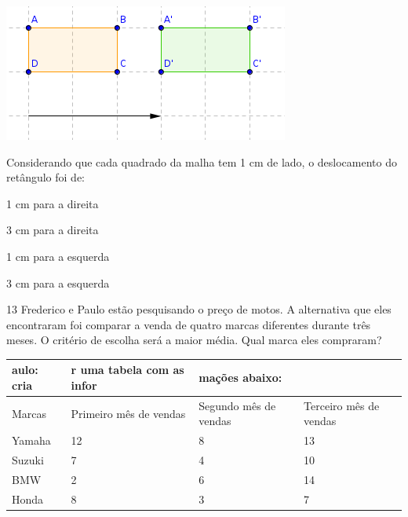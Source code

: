 \includegraphics{./imgSAEB_7_MAT/media/image98.png}

Considerando que cada quadrado da malha tem 1 cm de lado, o deslocamento
do retângulo foi de:

\begin{escolha}
\item
  1 cm para a direita
\item
  3 cm para a direita
\item
  1 cm para a esquerda
\item
  3 cm para a esquerda
\end{escolha}



\num{13} Frederico e Paulo estão pesquisando o preço de motos. A alternativa
que eles encontraram foi comparar a venda de quatro marcas diferentes
durante três meses. O critério de escolha será a maior média. Qual marca
eles compraram?

\begin{longtable}[]{@{}llll@{}}
\toprule
aulo: cria & r uma tabela com as infor & mações abaixo: &\tabularnewline
\midrule
\endhead
Marcas~ & Primeiro mês de vendas & Segundo mês de vendas & Terceiro mês
de vendas\tabularnewline
Yamaha & 12 & 8 & 13\tabularnewline
Suzuki & 7 & 4 & 10\tabularnewline
BMW & 2 & 6 & 14\tabularnewline
Honda & 8 & 3 & 7\tabularnewline
\bottomrule
\end{longtable}

